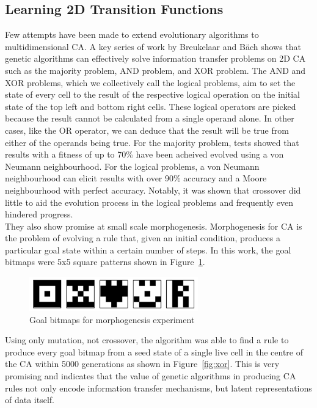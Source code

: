 \subsection{Learning 2D Transition Functions}

Few attempts have been made to extend evolutionary algorithms to multidimensional CA. A key series of work by Breukelaar and B{\"a}ch\cite{breukelaar2004evolving} shows that genetic algorithms can effectively solve information transfer problems on 2D CA such as the majority problem, AND problem, and XOR problem. The AND and XOR problems, which we collectively call the logical problems, aim to set the state of every cell to the result of the respective logical operation on the initial state of the top left and bottom right cells. These logical operators are picked because the result cannot be calculated from a single operand alone. In other cases, like the OR operator, we can deduce that the result will be true from either of the operands being true. For the majority problem, tests showed that results with a fitness of up to 70\% have been acheived evolved using a von Neumann neighbourhood. For the logical problems, a von Neumann neighbourhood can elicit results with over 90\% accuracy and a Moore neighbourhood with perfect accuracy. Notably, it was shown that crossover did little to aid the evolution process in the logical problems and frequently even hindered progress.\\

They also show promise at small scale morphogenesis. Morphogenesis for CA is the problem of evolving a rule that, given an initial condition, produces a particular goal state within a certain number of steps. In this work, the goal bitmaps were 5x5 square patterns shown in Figure~\ref{fig:goal-bitmaps}.\\

\begin{figure}[H]
\centering
\includegraphics[width=.5\textwidth]{images/bitmap-goals.png}
\caption{Goal bitmaps for morphogenesis experiment\cite{breukelaar2004evolving}}
\label{fig:goal-bitmaps}
\end{figure}

Using only mutation, not crossover, the algorithm was able to find a rule to produce every goal bitmap from a seed state of a single live cell in the centre of the CA within 5000 generations as shown in Figure~\ref{fig:xor}. This is very promising and indicates that the value of genetic algorithms in producing CA rules not only encode information transfer mechanisms, but latent representations of data itself.\\

